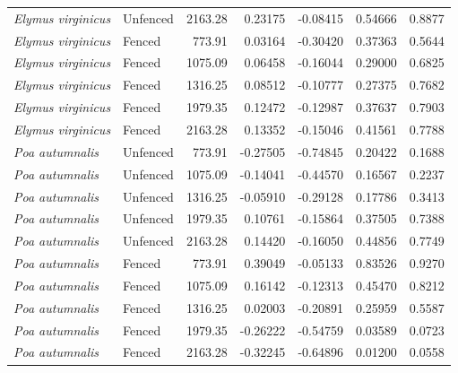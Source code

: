 \documentclass[12pt]{article}\usepackage[]{graphicx}\usepackage[dvipsnames]{xcolor}
\begin{document}
\begin{landscape}
\begin{table}[ht]
\begin{tabular}{llrrrrr}
\textit{Elymus virginicus} & Unfenced & 2163.28 & 0.23175  & -0.08415  & 0.54666  & 0.8877 \\
\textit{Elymus virginicus} & Fenced   & 773.91  & 0.03164  & -0.30420  & 0.37363  & 0.5644 \\
\textit{Elymus virginicus} & Fenced   & 1075.09 & 0.06458  & -0.16044  & 0.29000  & 0.6825 \\
\textit{Elymus virginicus} & Fenced   & 1316.25 & 0.08512  & -0.10777  & 0.27375  & 0.7682 \\
\textit{Elymus virginicus} & Fenced   & 1979.35 & 0.12472  & -0.12987  & 0.37637  & 0.7903 \\
\textit{Elymus virginicus} & Fenced   & 2163.28 & 0.13352  & -0.15046  & 0.41561  & 0.7788 \\
\textit{Poa autumnalis}    & Unfenced & 773.91  & -0.27505 & -0.74845  & 0.20422  & 0.1688 \\
\textit{Poa autumnalis}    & Unfenced & 1075.09 & -0.14041 & -0.44570  & 0.16567  & 0.2237 \\
\textit{Poa autumnalis}    & Unfenced & 1316.25 & -0.05910 & -0.29128  & 0.17786  & 0.3413 \\
\textit{Poa autumnalis}    & Unfenced & 1979.35 & 0.10761  & -0.15864  & 0.37505  & 0.7388 \\
\textit{Poa autumnalis}    & Unfenced & 2163.28 & 0.14420  & -0.16050  & 0.44856  & 0.7749 \\
\textit{Poa autumnalis}    & Fenced   & 773.91  & 0.39049  & -0.05133  & 0.83526  & 0.9270 \\
\textit{Poa autumnalis}    & Fenced   & 1075.09 & 0.16142  & -0.12313  & 0.45470  & 0.8212 \\
\textit{Poa autumnalis}    & Fenced   & 1316.25 & 0.02003  & -0.20891  & 0.25959  & 0.5587 \\
\textit{Poa autumnalis}    & Fenced   & 1979.35 & -0.26222 & -0.54759  & 0.03589  & 0.0723 \\
\textit{Poa autumnalis}    & Fenced   & 2163.28 & -0.32245 & -0.64896  & 0.01200  & 0.0558 \\
\hline
\end{tabular}
\end{table}
\end{landscape}
\clearpage
\end{document}
